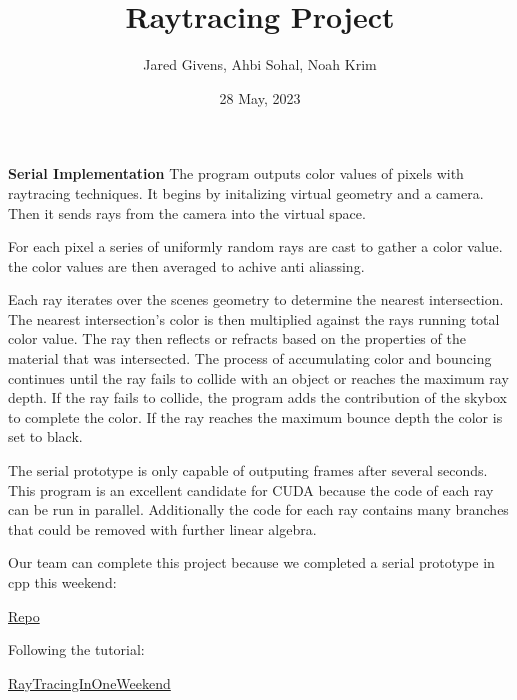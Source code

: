\documentclass{article}
\title{Raytracing Project}
\author{Jared Givens, Ahbi Sohal, Noah Krim}
\date{28 May, 2023}
\begin{document}
\maketitle
\textbf{Serial Implementation}
The program outputs color values of pixels with raytracing techniques. 
It begins by initalizing virtual geometry and a camera. Then it sends rays from the camera 
into the virtual space. 

For each pixel a series of uniformly random rays are 
cast to gather a color value. the color values are then averaged to achive anti 
aliassing. 

Each ray iterates over the scenes geometry to determine the nearest 
intersection. The nearest intersection's color is then multiplied against the 
rays running total color value. The ray then reflects or refracts based on the 
properties of the material that was intersected. The process of accumulating 
color and bouncing continues until the ray fails to collide with an object or 
reaches the maximum ray depth. If the ray fails to collide, the program adds the 
contribution of the skybox to complete the color.  If the ray reaches the 
maximum bounce depth the color is set to black.  

The serial prototype is only capable of outputing frames after several seconds.
This program is an excellent candidate for CUDA because the code of each ray can 
be run in parallel. Additionally the code for each ray contains many branches 
that could be removed with further linear algebra. 

Our team can complete this project because we completed a serial 
prototype in cpp this weekend: 

\href{https://github.com/JaredGivens/ECS158-Raytracing}{Repo}

Following the tutorial:

\href{https://raytracing.github.io/books/RayTracingInOneWeekend.html}{RayTracingInOneWeekend}
\end{document}

